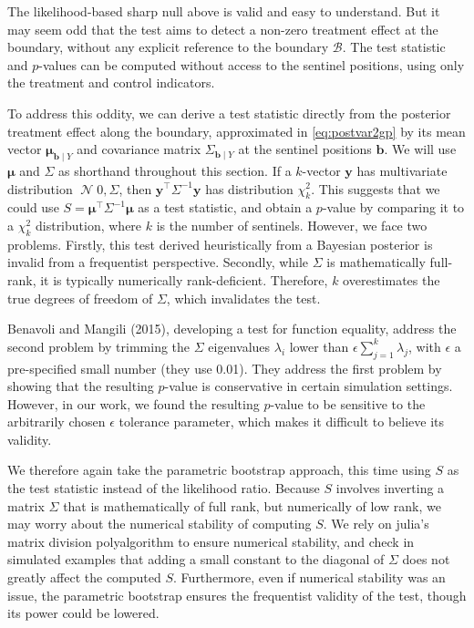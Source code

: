 \documentclass[letter]{article}
\DeclareMathOperator{\normal}{\mathcal{N}}
\newcommand{\trans}{^{\intercal}}
\newcommand{\yvec}{\mathbold{y}}
\newcommand{\muvec}{\mathbold{\mu}}
\newcommand{\boundary}{\mathcal{B}}
\newcommand{\sentinels}{\bm{b}}
\begin{document}
The likelihood-based sharp null above is valid and easy to understand.
But it may seem odd that the test aims to detect a non-zero treatment effect at the boundary, without any explicit reference to the boundary \(\boundary\). The test statistic and \(p\)-values can be computed without access to the sentinel positions, using only the treatment and control indicators.

To address this oddity, we can derive a test statistic directly from the posterior treatment effect along the boundary,
approximated in \eqref{eq:postvar2gp} by its mean vector \(\muvec_{\sentinels \mid Y}\)
and covariance matrix \(\Sigma_{\sentinels \mid Y}\) at the sentinel positions \(\sentinels\).
We will use \(\muvec\) and \(\Sigma\) as shorthand throughout this section.
If a \(k\)-vector \(\yvec\) has multivariate distribution \(\normal{0, \Sigma}\), then \(\yvec\trans \Sigma^{-1} \yvec\) has distribution \(\chi^2_k\).
This suggests that we could use \(S=\muvec\trans \Sigma^{-1} \muvec\) as a test statistic,
and obtain a \(p\)-value by comparing it to a \(\chi^2_k\) distribution, where \(k\) is the number of sentinels.
However, we face two problems.
Firstly, this test derived heuristically from a Bayesian posterior is invalid from a frequentist perspective.
Secondly, while \(\Sigma\) is mathematically full-rank, it is typically numerically rank-deficient.
Therefore, \(k\) overestimates the true degrees of freedom of \(\Sigma\), which invalidates the test.

Benavoli and Mangili (2015), developing a test for function equality, address the second problem by trimming the \(\Sigma\) eigenvalues \(\lambda_i\) lower than \(\epsilon \sum_{j=1}^k \lambda_j\), with \(\epsilon\) a pre-specified small number (they use 0.01).
They address the first problem by showing that the resulting \(p\)-value is conservative in certain simulation settings.
However, in our work, we found the resulting \(p\)-value to be sensitive to the arbitrarily chosen \(\epsilon\) tolerance parameter, which makes it difficult to believe its validity.

We therefore again take the parametric bootstrap approach, this time using \(S\) as the test statistic instead of the likelihood ratio.
Because \(S\) involves inverting a matrix \(\Sigma\) that is mathematically of full rank, but numerically of low rank, we may worry about the numerical stability of computing \(S\).
We rely on julia's matrix division polyalgorithm to ensure numerical stability,
and check in simulated examples that adding a small constant to the diagonal of \(\Sigma\) does not greatly affect the computed \(S\).
Furthermore, even if numerical stability was an issue,
the parametric bootstrap ensures the frequentist validity of the test,
though its power could be lowered.
    
\end{document}
